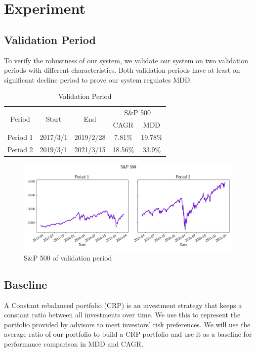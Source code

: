 \section{Experiment}
\subsection{Validation Period}
To verify the robustness of our system, we validate our system on two validation periods with different characteristics. Both validation periods have at least on significant decline period to prove our system regulates MDD.
\begin{table}[htb]
    \centering
    \begin{tabular}{|c|c|c|c|c|}
    \hline
    \multirow{2}{*}{Period} &
    \multirow{2}{*}{Start} &
    \multirow{2}{*}{End} &
    \multicolumn{2}{c|}{S\&P 500} \\ 
    \cline{4-5} &{} &{} & CAGR & MDD \\ \hline
    Period 1 & 2017/3/1 & 2019/2/28 & 7.81\% & 19.78\% \\ \hline
    Period 2 & 2019/3/1 & 2021/3/15 & 18.56\% & 33.9\% \\    
    \hline
    \end{tabular}
    \caption{Validation Period}
    \label{tab:validation_period}
\end{table}
\begin{figure}
    \centering
    \includegraphics[width=15cm]{images/sp500.png}
    \caption{S\&P 500 of validation period}
    \label{fig:my_label}
\end{figure}



\subsection{Baseline}
A Constant rebalanced portfolio (CRP) is an investment strategy that keeps a constant ratio between all investments over time. We use this to represent the portfolio provided by advisors to meet investors' risk preferences. We will use the average ratio of our portfolio to build a CRP portfolio and use it as a baseline for performance comparison in MDD and CAGR.
